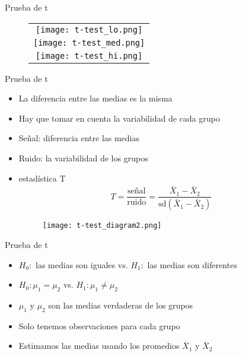 \documentclass{beamer}
\begin{document}
\begin{frame}{Prueba de t}
\begin{figure}
\begin{tabular}{c}
\texttt{[image: t-test\_lo.png]} \\ \texttt{[image: t-test\_med.png]} \\\texttt{[image: t-test\_hi.png]} \\
\end{tabular}
\end{figure}
\end{frame}

\begin{frame}{Prueba de t}
\begin{itemize}
\item La diferencia entre las medias es la misma
\item Hay que tomar en cuenta la variabilidad de cada grupo
\item Señal: diferencia entre las medias
\item Ruido: la variabilidad de los grupos
\item estadística T
\begin{align*}
T = \dfrac{\text{señal}}{\text{ruido}} = \dfrac{\bar{X}_1-\bar{X}_2}{\text{sd}(\bar{X}_1-\bar{X}_2)}
\end{align*}
\begin{figure}
\centering
\texttt{[image: t-test\_diagram2.png]}
\end{figure}
\end{itemize}
\end{frame}

\begin{frame}{Prueba de t}
\begin{itemize}
\item $H_0:$ las medias son iguales vs. $H_1:$ las medias son diferentes
\item $H_0:\mu_1 = \mu_2$  vs. $H_1:\mu_1 \neq \mu_2$
\item $\mu_1$ y $\mu_2$ son las medias verdaderas de los grupos
\item Solo tenemos observaciones para cada grupo
\item Estimamos las medias usando los promedios $\bar{X}_1$ y $\bar{X}_2$
\end{itemize}
\end{frame}
\end{document}
